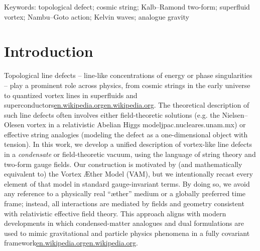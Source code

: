 \documentclass[12pt]{article}
\begin{document}
Keywords: topological defect; cosmic string; Kalb–Ramond two-form; superfluid vortex; Nambu–Goto action; Kelvin waves; analogue gravity


\section*{Introduction}

Topological line defects –  line-like concentrations of energy or phase singularities – play a prominent role across physics, from cosmic strings in the early universe to quantized vortex lines in superfluids and superconductors\href{https://en.wikipedia.org/wiki/Vortex_ring#:~:text=The%20resulting%20circulation%20Image%3A%20,frac%20%7B7%7D%7B4%7D%7D%5Cright%29%5Cend%7Baligned}{en.wikipedia.org}\href{https://en.wikipedia.org/wiki/Vortex_ring#:~:text=,frac%20%7B1%7D%7B4%7D%7D%5Cright}{en.wikipedia.org}. The theoretical description of such line defects often involves either field-theoretic solutions (e.g. the Nielsen–Olesen vortex in a relativistic Abelian Higgs modeljpac.nucleares.unam.mx) or effective string analogies (modeling the defect as a one-dimensional object with tension). In this work, we develop a unified description of vortex-like line defects in a \textit{condensate} or field-theoretic vacuum, using the language of string theory and two-form gauge fields. Our construction is motivated by (and mathematically equivalent to) the Vortex Æther Model (VAM), but we intentionally recast every element of that model in standard gauge-invariant terms. By doing so, we avoid any reference to a physically real “æther” medium or a globally preferred time frame; instead, all interactions are mediated by fields and geometry consistent with relativistic effective field theory. This approach aligns with modern developments in which condensed-matter analogues and dual formulations are used to mimic gravitational and particle physics phenomena in a fully covariant framework\href{https://en.wikipedia.org/wiki/Vortex_ring#:~:text=50.%20,On%20a%20spherical%20vortex}{en.wikipedia.org}\href{https://en.wikipedia.org/wiki/Vortex_ring#:~:text=pp.%C2%A01%E2%80%9310.%20doi%3A10.1007%2F978,On%20a%20spherical%20vortex}{en.wikipedia.org}.
\end{document}
